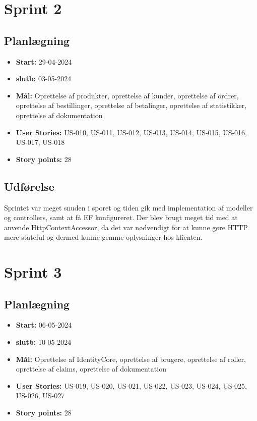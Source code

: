 \section{Sprint 2}
\label{sec:sprint-2}
\subsection{Planlægning}
\label{subsec:sprint-2-plan}
\begin{itemize}
    \item \textbf{Start:} 29-04-2024
    \item \textbf{slutb:} 03-05-2024
    \item \textbf{Mål:} Oprettelse af produkter, oprettelse af kunder, oprettelse af ordrer, oprettelse af bestillinger, oprettelse af betalinger, oprettelse af statistikker, oprettelse af dokumentation
    \item \textbf{User Stories:} US-010, US-011, US-012, US-013, US-014, US-015, US-016, US-017, US-018
    \item \textbf{Story points:} 28
\end{itemize}

\subsection{Udførelse}
\label{subsec:sprint-2-udforelse}
Sprintet var meget snuden i sporet og tiden gik med implementation af modeller og controllers, samt at få EF konfigureret.
Der blev brugt meget tid med at anvende HttpContextAccessor, da det var nødvendigt for at kunne gøre HTTP mere stateful og dermed kunne gemme oplysninger hos klienten.

\section{Sprint 3}
\label{sec:sprint-3}
\subsection{Planlægning}
\label{subsec:sprint-3-plan}
\begin{itemize}
    \item \textbf{Start:} 06-05-2024
    \item \textbf{slutb:} 10-05-2024
    \item \textbf{Mål:} Oprettelse af IdentityCore, oprettelse af brugere, oprettelse af roller, oprettelse af claims, oprettelse af dokumentation
    \item \textbf{User Stories:} US-019, US-020, US-021, US-022, US-023, US-024, US-025, US-026, US-027
    \item \textbf{Story points:} 28
\end{itemize}

